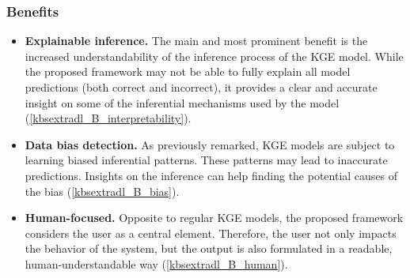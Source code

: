 \subsubsection*{Benefits}
\begin{itemize}
    \item \textbf{Explainable inference.} The main and most prominent benefit is the increased understandability of the inference process of the KGE model. While the proposed framework may not be able to fully explain all model predictions (both correct and incorrect), it provides a clear and accurate insight on some of the inferential mechanisms used by the model (\ref{kbsextradl_B_interpretability}).
    
    \item \textbf{Data bias detection.} As previously remarked, KGE models are subject to learning biased inferential patterns. These patterns may lead to inaccurate predictions. Insights on the inference can help finding the potential causes of the bias (\ref{kbsextradl_B_bias}).   
    
    \item \textbf{Human-focused.} Opposite to regular KGE models, the proposed framework considers the user as a central element. Therefore, the user not only impacts the behavior of the system, but the output is also formulated in a readable, human-understandable way (\ref{kbsextradl_B_human}). 
\end{itemize}


